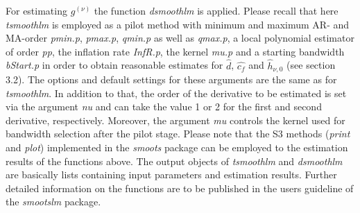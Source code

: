 \documentclass[12pt]{article}
\begin{document}
For estimating $g^{(\nu)}$ the function \textit{dsmoothlm} is applied. Please recall that here \textit{tsmoothlm} is employed as a pilot method with minimum and maximum AR- and MA-order \textit{pmin.p}, \textit{pmax.p}, \textit{qmin.p} as well as \textit{qmax.p}, a local polynomial estimator of order \textit{pp}, the inflation rate \textit{InfR.p}, the kernel \textit{mu.p} and a starting bandwidth \textit{bStart.p} in order to obtain reasonable estimates for $\hat{d}$, $\hat{c_f}$ and $\hat{h}_{\nu,0}$ (see section 3.2). The options and default settings for these arguments are the same as for \textit{tsmoothlm}. In addition to that, the order of the derivative to be estimated is set via the argument \textit{nu} and can take the value 1 or 2 for the first and second derivative, respectively. Moreover, the argument \textit{mu} controls the kernel used for bandwidth selection after the pilot stage. Please note that the S3 methods (\textit{print} and \textit{plot}) implemented in the \textit{smoots} package can be employed to the estimation results of the functions above. The output objects of \textit{tsmoothlm} and \textit{dsmoothlm} are basically lists containing input parameters and estimation results. Further detailed information on the functions are to be published in the users guideline of the \textit{smootslm} package.       
\end{document}
